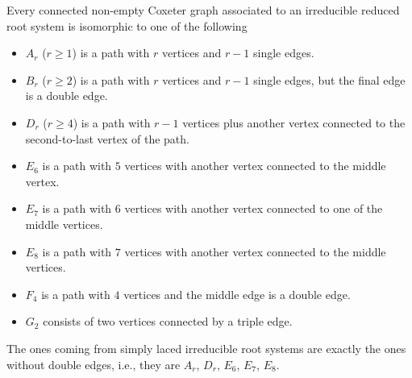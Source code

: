 Every connected non-empty Coxeter graph associated to an irreducible reduced root
system is isomorphic to one of the following
\begin{itemize}
	\item $A_r$ ($r\geq 1$) is a path with $r$ vertices and $r - 1$ single edges.
	\item $B_r$ ($r\geq 2$) is a path with $r$ vertices and $r - 1$ single edges, but
		the final edge is a double edge.
	\item $D_r$ ($r\geq 4$) is a path with $r - 1$ vertices plus another vertex connected
		to the second-to-last vertex of the path.
	\item $E_6$ is a path with $5$ vertices with another vertex connected to the middle
		vertex.
	\item $E_7$ is a path with  $6$ vertices with another vertex connected to one of
		the middle vertices.
	\item $E_8$ is a path with $7$ vertices with another vertex connected to the
		middle vertices.
	\item $F_4$ is a path with $4$ vertices and the middle edge is a double edge.
	\item $G_2$ consists of two vertices connected by a triple edge.
\end{itemize}

The ones coming from simply laced irreducible root systems are exactly the ones without
double edges, i.e., they are $A_r$, $D_r$, $E_6$, $E_7$, $E_8$.
